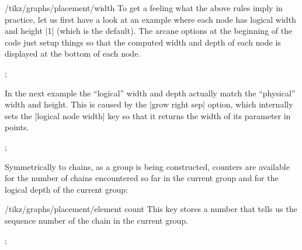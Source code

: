 \begin{key}{/tikz/graphs/placement/width}
  To get a feeling what the above rules imply in practice, let us
  first have a look at an example where each node has logical width
  and height |1| (which is the default). The arcane options at the
  beginning of the code just setup things so that the computed width
  and depth of each node is displayed at the bottom of each node.
\begin{codeexample}[]
\tikz
  ;
\end{codeexample}
  In the next example the ``logical'' width and depth actually match
  the ``physical'' width and height. This is caused by the
  |grow right sep| option, which internally sets the
  |logical node width| key so that it returns the width of its
  parameter in points.
\begin{codeexample}[]
\tikz
  ;
\end{codeexample}  
\end{key}

Symmetrically to chains, as a group is being constructed, counters are
available for the number of chains encountered so far in the current
group and for the logical depth of the current group:
\begin{key}{/tikz/graphs/placement/element count}
  This key stores a number that tells us the sequence number of the
  chain in the current group.
\begin{codeexample}[]
\tikz {};
\end{codeexample}
\end{key}

